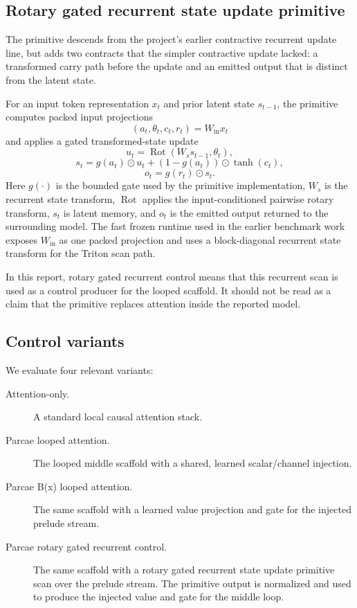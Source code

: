 \documentclass[11pt]{article}
\newcommand{\primitive}{rotary gated recurrent state update primitive}
\newcommand{\primitivecontrol}{rotary gated recurrent control}
\newcommand{\parcae}{Parcae}
\newcommand{\bx}{B(x)}
\begin{document}
\subsection{Rotary gated recurrent state update primitive}

The primitive descends from the project's earlier contractive recurrent update
line, but adds two contracts that the simpler contractive update lacked: a
transformed carry path before the update and an emitted output that is distinct
from the latent state.

For an input token representation $x_t$ and prior latent state $s_{t-1}$, the
primitive computes packed input projections
\[
  (a_t,\theta_t,c_t,r_t) = W_{\mathrm{in}} x_t
\]
and applies a gated transformed-state update
\[
  u_t = \operatorname{Rot}(W_s s_{t-1}, \theta_t),
\]
\[
  s_t = g(a_t) \odot u_t + (1 - g(a_t)) \odot \tanh(c_t),
\]
\[
  o_t = g(r_t) \odot s_t.
\]
Here $g(\cdot)$ is the bounded gate used by the primitive implementation,
$W_s$ is the recurrent state transform, $\operatorname{Rot}$ applies the
input-conditioned pairwise rotary transform, $s_t$ is latent memory, and $o_t$
is the emitted output returned to the surrounding model. The fast frozen
runtime used in the earlier benchmark work exposes $W_{\mathrm{in}}$ as one packed
projection and uses a block-diagonal recurrent state transform for the Triton
scan path.

In this report, \primitivecontrol{} means that this recurrent scan is used as a
control producer for the looped scaffold. It should not be read as a claim that
the primitive replaces attention inside the reported model.

\subsection{Control variants}

We evaluate four relevant variants:

\begin{description}
  \item[Attention-only.] A standard local causal attention stack.
  \item[\parcae{} looped attention.] The looped middle scaffold with a shared,
    learned scalar/channel injection.
  \item[\parcae{} \bx{} looped attention.] The same scaffold with a learned
    value projection and gate for the injected prelude stream.
  \item[\parcae{} rotary gated recurrent control.] The same scaffold with a
    \primitive{} scan over the prelude stream. The primitive output is
    normalized and used to produce the injected value and gate for the middle
    loop.
\end{description}
\end{document}
